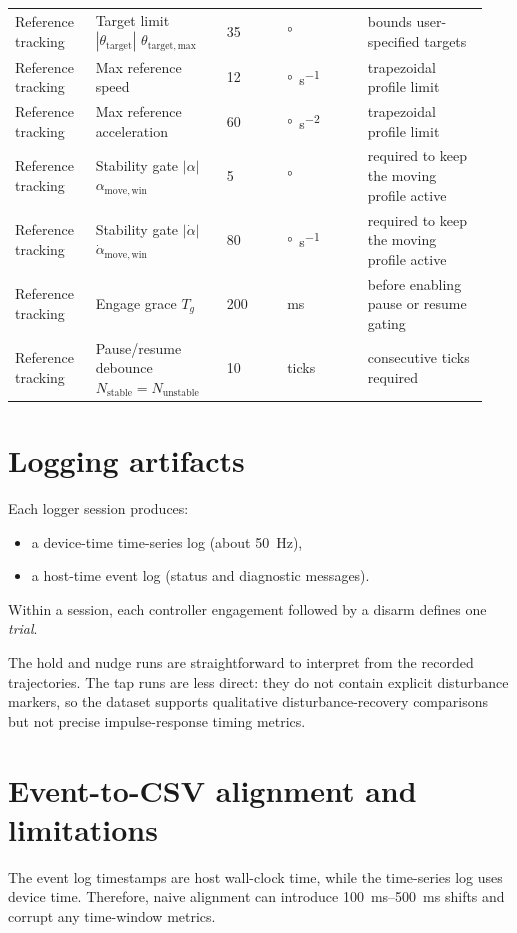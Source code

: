\begin{longtable}{@{}p{0.16\linewidth}p{0.26\linewidth}p{0.12\linewidth}p{0.16\linewidth}p{0.24\linewidth}@{}}
  \addlinespace
  Reference tracking & Target limit $|\theta_{\mathrm{target}}|$ $\theta_{\mathrm{target,max}}$ & 35 & \si{\degree} & bounds user-specified targets \\
  Reference tracking & Max reference speed & 12 & \si{\degree\per\second} & trapezoidal profile limit \\
  Reference tracking & Max reference acceleration & 60 & \si{\degree\per\second\squared} & trapezoidal profile limit \\
  Reference tracking & Stability gate $|\alpha|$ $\alpha_{\mathrm{move,win}}$ & 5 & \si{\degree} & required to keep the moving profile active \\
  Reference tracking & Stability gate $|\dot{\alpha}|$ $\dot{\alpha}_{\mathrm{move,win}}$ & 80 & \si{\degree\per\second} & required to keep the moving profile active \\
  Reference tracking & Engage grace $T_g$ & 200 & ms & before enabling pause or resume gating \\
  Reference tracking & Pause/resume debounce $N_{\mathrm{stable}}=N_{\mathrm{unstable}}$ & 10 & ticks & consecutive ticks required \\
\end{longtable}
\endgroup

\section{Logging artifacts}
Each logger session produces:
\begin{itemize}
  \item a device-time time-series log (about \SI{50}{Hz}),
  \item a host-time event log (status and diagnostic messages).
\end{itemize}
Within a session, each controller engagement followed by a disarm defines one \emph{trial}.

The hold and nudge runs are straightforward to interpret from the recorded trajectories. The tap runs are less direct: they do not contain explicit disturbance markers, so the dataset supports qualitative disturbance-recovery comparisons but not precise impulse-response timing metrics.

\section{Event-to-CSV alignment and limitations}
The event log timestamps are host wall-clock time, while the time-series log uses device time. Therefore, naive alignment can introduce \SIrange{100}{500}{ms} shifts and corrupt any time-window metrics.

